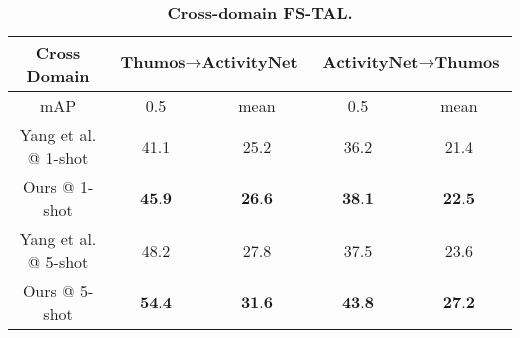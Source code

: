 \documentclass{bmvc2k}
\begin{document}
\begin{table}[]
\centering
\resizebox{0.7\columnwidth}{!}
{
\begin{tabular}{@{}c|cc|cc@{}}
\toprule
Cross Domain & \multicolumn{2}{c|}{$\textbf{Thumos} \rightarrow \textbf{ActivityNet}$} & \multicolumn{2}{c}{$\textbf{ActivityNet} \rightarrow \textbf{Thumos}$} \\ \midrule
mAP          & 0.5                      & mean                     & 0.5                      & mean                     \\ \midrule
Yang et al. \cite{yang2020localizing} @ 1-shot & 41.1                      & 25.2                      & 36.2                      & 21.4                      \\
Ours @ 1-shot     & $\textbf{45.9}$                      & $\textbf{26.6}$                      & $\textbf{38.1}$                      & $\textbf{22.5}$                      \\ \midrule \midrule
Yang et al. \cite{yang2020localizing} @ 5-shot & 48.2                      & 27.8                      & 37.5                      & 23.6                      \\
Ours @ 5-shot     & $\textbf{54.4}$                      & $\textbf{31.6}$                     & $\textbf{43.8}$                      & $\textbf{27.2}$                      \\ \bottomrule
\end{tabular}
}
\vspace{0.15in}
\caption{\textbf{Cross-domain FS-TAL.}
}
\label{tab:cross_domain}
\vspace{-0.5cm}
\end{table}
\end{document}
